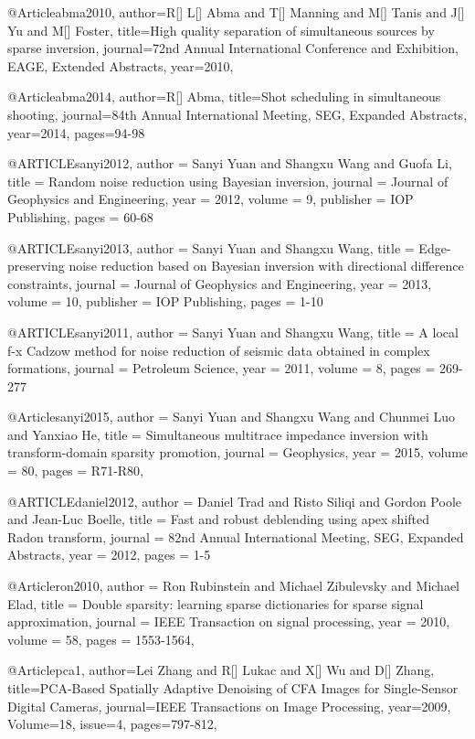     
@Article{abma2010,
  author={R[] L[] Abma and T[] Manning and M[] Tanis and J[] Yu and M[] Foster},
  title={High quality separation of simultaneous sources by sparse inversion},
  journal={72nd Annual International Conference and Exhibition, EAGE, Extended Abstracts},
  year=2010,
}

@Article{abma2014,
  author={R[] Abma},
  title={Shot scheduling in simultaneous shooting},
  journal={84th Annual International Meeting, SEG, Expanded Abstracts},
  year=2014,
  pages={94-98}
}

@ARTICLE{sanyi2012,
  author = {Sanyi Yuan and Shangxu Wang and Guofa Li},
  title = {Random noise reduction using Bayesian inversion},
  journal = {Journal of Geophysics and Engineering},
  year = {2012},
  volume = {9},
  publisher = {IOP Publishing},
  pages = {60-68}
}

@ARTICLE{sanyi2013,
  author = {Sanyi Yuan and Shangxu Wang},
  title = {Edge-preserving noise reduction based on Bayesian inversion with directional difference constraints},
  journal = {Journal of Geophysics and Engineering},
  year = {2013},
  volume = {10},
  publisher = {IOP Publishing},
  pages = {1-10}
}

@ARTICLE{sanyi2011,
  author = {Sanyi Yuan and Shangxu Wang},
  title = {A local f-x Cadzow method for noise reduction of seismic data obtained in complex formations},
  journal = {Petroleum Science},
  year = {2011},
  volume = {8},
  pages = {269-277}
}

@Article{sanyi2015,
  author = 	 {Sanyi Yuan and Shangxu Wang and Chunmei Luo and Yanxiao He},
  title = 	 {Simultaneous multitrace impedance inversion with transform-domain sparsity promotion},
  journal = 	 {Geophysics},
  year = 	 2015,
  volume =	 80,
  pages =	 {R71-R80},
}

@ARTICLE{daniel2012,
  author = {Daniel Trad and Risto Siliqi and Gordon Poole and Jean-Luc Boelle},
  title = {Fast and robust deblending using apex shifted Radon transform},
  journal = {82nd Annual International Meeting, SEG, Expanded Abstracts},
  year = {2012},
  pages = {1-5}
}

@Article{ron2010,
  author = 	 {Ron Rubinstein and Michael Zibulevsky and Michael Elad},
  title = 	 {Double sparsity: learning sparse dictionaries for sparse signal approximation},
  journal = 	 {IEEE Transaction on signal processing},
  year = 	 2010,
  volume =	 58,
  pages =	 {1553-1564},
}

@Article{pca1,
  author={Lei Zhang and R[] Lukac and X[] Wu and D[] Zhang},
  title={PCA-Based Spatially Adaptive Denoising of {CFA} Images for Single-Sensor Digital Cameras},
  journal={IEEE Transactions on Image Processing},
  year=2009,
  Volume=18,
  issue=4,
  pages={797-812},
}

